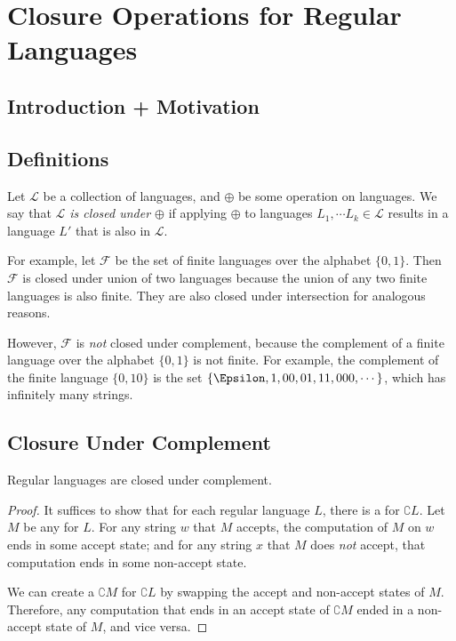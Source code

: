 \chapter{Closure Operations for Regular Languages}

\section{Introduction + Motivation}

\section{Definitions}

Let $\mathcal{L}$ be a collection of languages, and $\oplus$ be some operation on languages. 
We say that \textit{$\mathcal{L}$ is closed under $\oplus$} if applying $\oplus$ to languages $L_1, \cdots L_k \in \mathcal{L}$ results in a language $L'$ that is also in $\mathcal{L}$.

For example, let $\mathcal{F}$ be the set of finite languages over the alphabet $\{0,1\}$. Then $\mathcal{F}$ is closed under union of two languages because the union of any two finite languages is also finite.
They are also closed under intersection for analogous reasons.

However, $\mathcal{F}$ is \textit{not} closed under complement, because the complement of a finite language over the alphabet $\{0,1\}$ is not finite. 
For example, the complement of the finite language $\{0, 10\}$ is the set $\{\Epsilon, 1, 00, 01, 11, 000, \cdots\}$, which has infinitely many strings.

\section{Closure Under Complement}

\begin{theorem}
	Regular languages are closed under complement.
\end{theorem}

\begin{proof}
	It suffices to show that for each regular language $L$, there is a \DFA for $\complement{L}$.
	Let $M$ be any \DFA for $L$. For any string $w$ that $M$ accepts, the computation of $M$ on $w$ ends in some accept state; and for any string $x$ that $M$ does \textit{not} accept, that computation ends in some non-accept state.
	
	We can create a \DFA $\complement{M}$ for $\complement{L}$ by swapping the accept and non-accept states of $M$.
	Therefore, any computation that ends in an accept state of $\complement{M}$ ended in a non-accept state of $M$, and vice versa. 
\end{proof}

